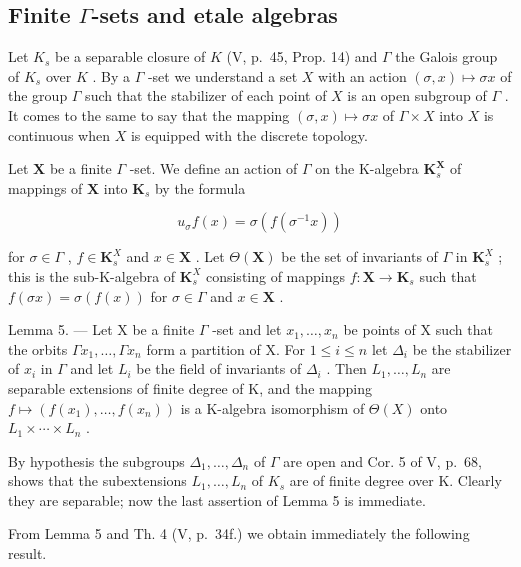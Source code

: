 \subsection{\texorpdfstring{Finite \(\Gamma\)-sets and etale algebras}{Finite Gamma-sets and etale algebras}}

Let \(K_s\) be a separable closure of \(K\) (V, p.~45, Prop. 14) and \(\Gamma\) the Galois group of \(K_s\) over \(K\) . By a \(\Gamma\) -set we understand a set \(X\) with an action \((\sigma, x) \mapsto \sigma x\) of the group \(\Gamma\) such that the stabilizer of each point of \(X\) is an open subgroup of \(\Gamma\) . It comes to the same to say that the mapping \((\sigma, x) \mapsto \sigma x\) of \(\Gamma \times X\) into \(X\) is continuous when \(X\) is equipped with the discrete topology.

Let \(\mathbf{X}\) be a finite \(\Gamma\) -set. We define an action of \(\Gamma\) on the K-algebra \(\mathbf{K}_s^{\mathbf{X}}\) of mappings of \(\mathbf{X}\) into \(\mathbf{K}_s\) by the formula

\[
u _ {\sigma} f (x) = \sigma \left(f \left(\sigma^ {- 1} x\right)\right)\tag{12}
\]

for \(\sigma \in \Gamma\) , \(f \in \mathbf{K}_s^X\) and \(x \in \mathbf{X}\) . Let \(\Theta(\mathbf{X})\) be the set of invariants of \(\Gamma\) in \(\mathbf{K}_s^X\) ; this is the sub-K-algebra of \(\mathbf{K}_s^X\) consisting of mappings \(f: \mathbf{X} \to \mathbf{K}_s\) such that \(f(\sigma x) = \sigma(f(x))\) for \(\sigma \in \Gamma\) and \(x \in \mathbf{X}\) .

Lemma 5. --- Let X be a finite \(\Gamma\) -set and let \(x_1, \ldots, x_n\) be points of X such that the orbits \(\Gamma x_1, \ldots, \Gamma x_n\) form a partition of X. For \(1 \leqslant i \leqslant n\) let \(\Delta_i\) be the stabilizer of \(x_i\) in \(\Gamma\) and let \(L_i\) be the field of invariants of \(\Delta_i\) . Then \(L_1, \ldots, L_n\) are separable extensions of finite degree of K, and the mapping \(f \mapsto (f(x_1), \ldots, f(x_n))\) is a K-algebra isomorphism of \(\Theta(X)\) onto \(L_1 \times \cdots \times L_n\) .

By hypothesis the subgroups \(\Delta_{1},\ldots,\Delta_{n}\) of \(\Gamma\) are open and Cor. 5 of V, p.~68, shows that the subextensions \(L_{1},\ldots,L_{n}\) of \(K_{s}\) are of finite degree over K. Clearly they are separable; now the last assertion of Lemma 5 is immediate.

From Lemma 5 and Th. 4 (V, p.~34f.) we obtain immediately the following result.

